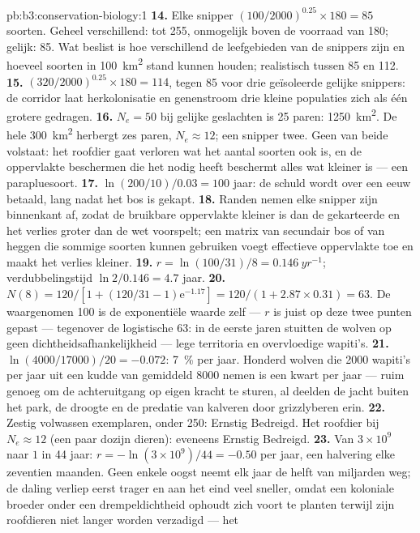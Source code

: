 \begin{solution}{pb:b3:conservation-biology:1}
\textbf{14.} Elke snipper $(100/2000)^{0.25}\times 180 = 85$ soorten.
Geheel verschillend: tot 255, onmogelijk boven de voorraad van 180;
gelijk: 85. Wat beslist is hoe verschillend de leefgebieden van de
snippers zijn en hoeveel soorten in \qty{100}{km^2} stand kunnen
houden; realistisch tussen 85 en 112.
\textbf{15.} $(320/2000)^{0.25}\times 180 = 114$, tegen 85 voor drie
geïsoleerde gelijke snippers: de corridor laat herkolonisatie en
genenstroom drie kleine populaties zich als één grotere gedragen.
\textbf{16.} $N_{e} = 50$ bij gelijke geslachten is 25 paren: \qty{1250}{km^2}.
De hele \qty{300}{km^2} herbergt zes paren, $N_{e} \approx 12$; een
snipper twee. Geen van beide volstaat: het roofdier gaat verloren wat
het aantal soorten ook is, en de oppervlakte beschermen die het nodig
heeft beschermt alles wat kleiner is --- een parapluesoort.
\textbf{17.} $\ln(200/10)/0.03 = 100$ jaar: de schuld wordt over een
eeuw betaald, lang nadat het bos is gekapt.
\textbf{18.} Randen nemen elke snipper zijn binnenkant af, zodat de
bruikbare oppervlakte kleiner is dan de gekarteerde en het verlies
groter dan de wet voorspelt; een matrix van secundair bos of van heggen
die sommige soorten kunnen gebruiken voegt effectieve oppervlakte toe
en maakt het verlies kleiner.
\textbf{19.} $r = \ln(100/31)/8 = \qty{0.146}{yr^{-1}}$;
verdubbelingstijd $\ln 2/0.146 = 4.7$ jaar.
\textbf{20.} $N(8) = 120/[1 + (120/31 - 1)\mathrm{e}^{-1.17}] = 120/(1 +
2.87\times 0.31) = 63$. De waargenomen 100 is de exponentiële waarde
zelf --- $r$ is juist op deze twee punten gepast --- tegenover de
logistische 63: in de eerste jaren stuitten de wolven op geen
dichtheidsafhankelijkheid --- lege territoria en overvloedige wapiti's.
\textbf{21.} $\ln(4000/\num{17000})/20 = -0.072$: \qty{7}{\%} per jaar.
Honderd wolven die \num{2000} wapiti's per jaar uit een kudde van
gemiddeld \num{8000} nemen is een kwart per jaar --- ruim genoeg om de
achteruitgang op eigen kracht te sturen, al deelden de jacht buiten het
park, de droogte en de predatie van kalveren door grizzlyberen erin.
\textbf{22.} Zestig volwassen exemplaren, onder 250: Ernstig Bedreigd.
Het roofdier bij $N_{e} \approx 12$ (een paar dozijn dieren): eveneens
Ernstig Bedreigd.
\textbf{23.} Van $3\times 10^{9}$ naar $1$ in 44 jaar: $r = -\ln(3\times
10^{9})/44 = -0.50$ per jaar, een halvering elke zeventien maanden.
Geen enkele oogst neemt elk jaar de helft van miljarden weg; de daling
verliep eerst trager en aan het eind veel sneller, omdat een koloniale
broeder onder een drempeldichtheid ophoudt zich voort te planten
terwijl zijn roofdieren niet langer worden verzadigd --- het

\end{solution}
